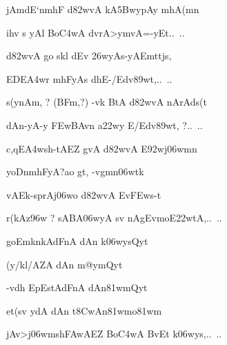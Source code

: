 {\dn jAmdE`nm\0hF{\qva} d\382wvA kA\35BwypAy mhA(mn\?\thinspace{\dandab} \dontdisplaylinenum }%


{\dn ih\4v s yAl\2 Bo\3C4wA d\?vrA>ymvA=-yEt{..\dn\ ..} \veg\dontdisplaylinenum }%


{\dn d\382wvA go skl\2 d\?Ev \326wyAs-yAEmtt\?js,\thinspace{\dandab} \dontdisplaylinenum }%


{\dn {}EDE\3A4wr mhFyAs d\?hE-/Edv\389wt,{..\dn\ ..} \veg\dontdisplaylinenum }%


{\dn s(ynAm, {\rs ?\re} {\rs (\re}BFm,{\rs ?)\re} -vk\2 BtA\0 d\382wvA nArAds(t\thinspace{\dandab} \dontdisplaylinenum }%


{\dn dAn-yA-y \3FEwBAv\?n a\322wy\2 E/Edv\389wt, {\rs ?\re}{..\dn\ ..} \veg\dontdisplaylinenum }%


{\dn c,qE\3A4wsh-tAEZ gvA\2 d\382wvA E\392wj\306wmn\?\thinspace{\dandab} \dontdisplaylinenum }%


{\dn {}yo{\qvb}DnmhFyA{\rs ?\re}ao gt, -vg\0mn\306wtk \veg\dontdisplaylinenum }%


{\dn vAEk-sp\0rAj\?\306wo d\382wvA Ev\3FEws\2-t\thinspace{\dandab} \dontdisplaylinenum }%


{\dn r(kAz\396w {\rs ?\re} sABA\306wyA sv\?{\qvb} nAgEvmoE\322wtA,{..\dn\ ..} \veg\dontdisplaylinenum }%


{\dn goEmknkAdFnA\2 dAn\2 k\306wysQyt\?\thinspace{\dandab} \dontdisplaylinenum }%

{\dn {}(y/kl/AZA\2 dAn\2 m@ymQyt\? \danda\dontdisplaylinenum }%


{\dn -vd\?h\2 EpEstAdFnA\2 dAn\381wmQyt \veg\dontdisplaylinenum }%


{\dn et(sv{\rdt} ydA dAn\2 t\38CwAn\381wmo\381wm\thinspace{\dandab} \dontdisplaylinenum }%


{\dn jAv>j\306wmsh\3FAwAEZ Bo\3C4wA BvEt k\306wys,{..\dn\ ..} \veg\dontdisplaylinenum }%


